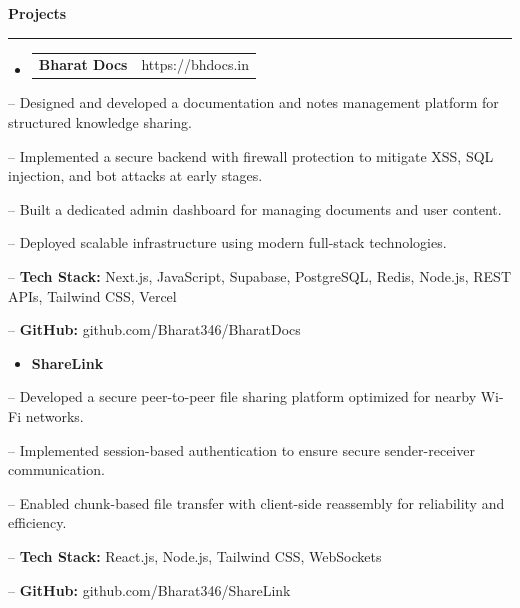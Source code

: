 \documentclass[11pt]{article}
\begin{document}
\vspace{10pt}
{\fontsize{15}{17}\selectfont\bfseries Projects\par}
\vspace{2pt}
{\color{rulegray}\rule{\textwidth}{0.5pt}}
\vspace{5pt}
\begin{itemize}[leftmargin=16pt,itemsep=0pt,topsep=0pt]
\item \begin{tabularx}{\textwidth}{@{}Xr@{}}
\textbf{Bharat Docs} & https://bhdocs.in
\end{tabularx}
\end{itemize}
\hspace*{14pt}-- Designed and developed a documentation and notes management platform for structured knowledge sharing.\par
\hspace*{14pt}-- Implemented a secure backend with firewall protection to mitigate XSS, SQL injection, and bot attacks at early stages.\par
\hspace*{14pt}-- Built a dedicated admin dashboard for managing documents and user content.\par
\hspace*{14pt}-- Deployed scalable infrastructure using modern full-stack technologies.\par
\hspace*{14pt}-- \textbf{Tech Stack:} Next.js, JavaScript, Supabase, PostgreSQL, Redis, Node.js, REST APIs, Tailwind CSS, Vercel\par
\hspace*{14pt}-- \textbf{GitHub:} github.com/Bharat346/BharatDocs

\vspace{6pt}
\begin{itemize}[leftmargin=16pt,itemsep=0pt,topsep=0pt]
\item \textbf{ShareLink}
\end{itemize}
\hspace*{14pt}-- Developed a secure peer-to-peer file sharing platform optimized for nearby Wi-Fi networks.\par
\hspace*{14pt}-- Implemented session-based authentication to ensure secure sender-receiver communication.\par
\hspace*{14pt}-- Enabled chunk-based file transfer with client-side reassembly for reliability and efficiency.\par
\hspace*{14pt}-- \textbf{Tech Stack:} React.js, Node.js, Tailwind CSS, WebSockets\par
\hspace*{14pt}-- \textbf{GitHub:} github.com/Bharat346/ShareLink
\end{document}

